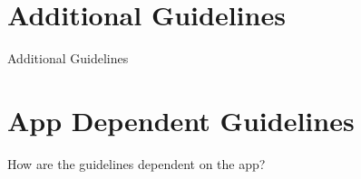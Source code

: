 \documentclass[
  10pt
, handout
]{beamer}
\begin{document}
\section{Additional Guidelines}

\begin{frame}{Additional Guidelines}
\end{frame}

\section{App Dependent Guidelines}

\begin{frame}{How are the guidelines dependent on the app?}
\end{frame}
\end{document}

